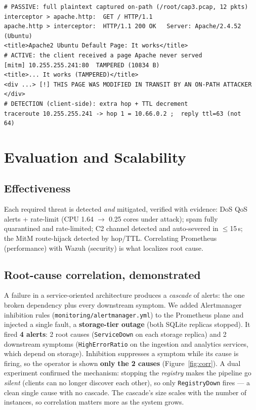 \documentclass[11pt,a4paper]{article}
\newcommand{\code}[1]{\texttt{\small #1}}
\begin{document}
\begin{lstlisting}[caption={Threat 4 evidence: plaintext captured on-path, the page altered in transit, and the client-side detection.},label=lst:mitm]
# PASSIVE: full plaintext captured on-path (/root/cap3.pcap, 12 pkts)
interceptor > apache.http:  GET / HTTP/1.1
apache.http > interceptor:  HTTP/1.1 200 OK   Server: Apache/2.4.52 (Ubuntu)
<title>Apache2 Ubuntu Default Page: It works</title>
# ACTIVE: the client received a page Apache never served
[mitm] 10.255.255.241:80  TAMPERED (10834 B)
<title>... It works (TAMPERED)</title>
<div ...> [!] THIS PAGE WAS MODIFIED IN TRANSIT BY AN ON-PATH ATTACKER </div>
# DETECTION (client-side): extra hop + TTL decrement
traceroute 10.255.255.241 -> hop 1 = 10.66.0.2 ;  reply ttl=63 (not 64)
\end{lstlisting}

\section{Evaluation and Scalability}\label{sec:eval}

\subsection{Effectiveness}
Each required threat is detected \emph{and} mitigated, verified with evidence: DoS QoS alerts +
rate-limit (CPU 1.64 $\rightarrow$ 0.25 cores under attack); spam fully quarantined and rate-limited;
C2 channel detected and auto-severed in $\le$15\,s; the MitM route-hijack detected by hop/TTL.
Correlating Prometheus (performance) with Wazuh (security) is what localizes root cause.

\subsection{Root-cause correlation, demonstrated}\label{sec:corr}
A failure in a service-oriented architecture produces a \emph{cascade} of alerts: the one broken
dependency plus every downstream symptom. We added Alertmanager inhibition rules
(\code{monitoring/alertmanager.yml}) to the Prometheus plane and injected a single fault, a
\textbf{storage-tier outage} (both SQLite replicas stopped). It fired \textbf{4 alerts}: 2 root
causes (\code{ServiceDown} on each storage replica) and 2 downstream symptoms
(\code{HighErrorRatio} on the ingestion and analytics services, which depend on storage).
Inhibition suppresses a symptom while its cause is firing, so the operator is shown
\textbf{only the 2 causes} (Figure~\ref{fig:corr}). A dual experiment confirmed the mechanism:
stopping the \emph{registry} makes the pipeline go \emph{silent} (clients can no longer discover
each other), so only \code{RegistryDown} fires --- a clean single cause with no cascade. The
cascade's size scales with the number of instances, so correlation matters more as the system
grows.
\end{document}

